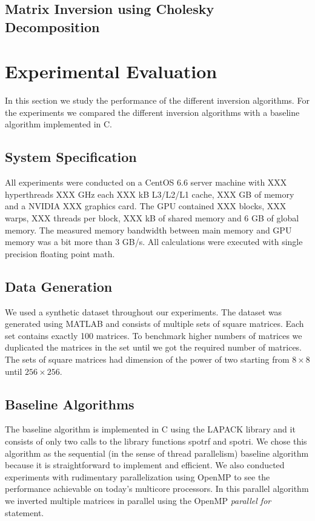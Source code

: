 \documentclass[11pt]{article}
\begin{document}
\subsection{Matrix Inversion using Cholesky Decomposition}

\section{Experimental Evaluation}

In this section we study the performance of the different inversion algorithms. For the experiments we compared the different inversion algorithms with a baseline algorithm implemented in C.

\subsection{System Specification}

All experiments were conducted on a CentOS 6.6 server machine with XXX hyperthreads XXX GHz each XXX kB L3/L2/L1 cache, XXX GB of memory and a NVIDIA XXX graphics card. The GPU contained XXX blocks, XXX warps, XXX threads per block, XXX kB of shared memory and 6 GB of global memory. The measured memory bandwidth between main memory and GPU memory was a bit more than 3 GB/s. All calculations were executed with single precision floating point math.

\subsection{Data Generation}

We used a synthetic dataset throughout our experiments. The dataset was generated using MATLAB and consists of multiple sets of square matrices. Each set contains exactly 100 matrices. To benchmark higher numbers of matrices we duplicated the matrices in the set until we got the required number of matrices. The sets of square matrices had dimension of the power of two starting from $8 \times 8$ until $256 \times 256$.

\subsection{Baseline Algorithms}

The baseline algorithm is implemented in C using the LAPACK library and it consists of only two calls to the library functions spotrf and spotri. We chose this algorithm as the sequential (in the sense of thread parallelism) baseline algorithm because it is straightforward to implement and efficient. We also conducted experiments with rudimentary parallelization using OpenMP to see the performance achievable on today's multicore processors. In this parallel algorithm we inverted multiple matrices in parallel using the OpenMP \textit{parallel for} statement.
\end{document}
